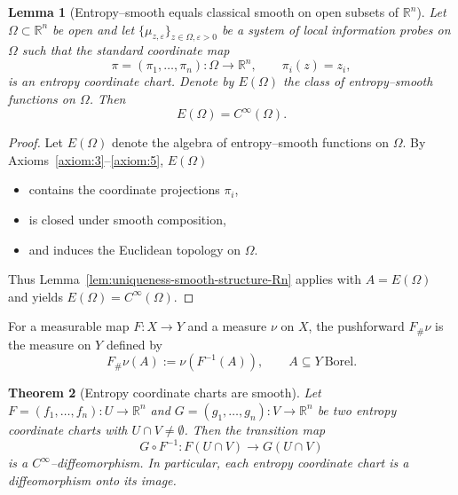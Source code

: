 \documentclass[11pt]{amsart}
\newtheorem{theorem}{Theorem}[section]
\newtheorem{lemma}[theorem]{Lemma}
\theoremstyle{definition}
\theoremstyle{remark}
\begin{document}
\begin{lemma}[Entropy--smooth equals classical smooth on open subsets of $\mathbb{R}^n$]
\label{lem:entropy-equals-classical-Rn}
Let $\Omega\subset\mathbb{R}^n$ be open and let $\{\mu_{z,\varepsilon}\}_{z\in\Omega,\varepsilon>0}$
be a system of local information probes on $\Omega$ such that the standard coordinate map
\[
\pi=(\pi_1,\dots,\pi_n):\Omega\longrightarrow\mathbb{R}^n,\qquad \pi_i(z)=z_i,
\]
is an entropy coordinate chart. Denote by $E(\Omega)$ the class of entropy--smooth functions
on $\Omega$. Then
\[
E(\Omega)=C^\infty(\Omega).
\]
\end{lemma}
\begin{proof}
Let $E(\Omega)$ denote the algebra of entropy--smooth functions on $\Omega$.
By Axioms~\ref{axiom:3}--\ref{axiom:5}, $E(\Omega)$
\begin{itemize}
\item contains the coordinate projections $\pi_i$,
\item is closed under smooth composition,
\item and induces the Euclidean topology on $\Omega$.
\end{itemize}
Thus Lemma~\ref{lem:uniqueness-smooth-structure-Rn} applies with $A=E(\Omega)$
and yields $E(\Omega)=C^\infty(\Omega)$.
\end{proof}

For a measurable map $F : X \to Y$ and a measure $\nu$ on $X$, the pushforward $F_\#\nu$ is the measure on $Y$ defined by
\[
F_\#\nu(A) := \nu(F^{-1}(A)), \qquad A \subseteq Y \ \text{Borel}.
\]

\begin{theorem}[Entropy coordinate charts are smooth]
\label{thm:entropy-charts-smooth}
Let $F=(f_1,\dots,f_n):U\to\mathbb{R}^n$ and 
$G=(g_1,\dots,g_n):V\to\mathbb{R}^n$ be two entropy coordinate charts with 
$U\cap V\neq\emptyset$.  Then the transition map
\[
G\circ F^{-1}:F(U\cap V)\longrightarrow G(U\cap V)
\]
is a $C^\infty$--diffeomorphism.  In particular, each entropy coordinate 
chart is a diffeomorphism onto its image.
\end{theorem}
\end{document}
